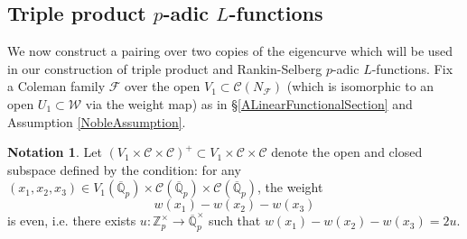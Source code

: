 \documentclass[10pt, oneside]{amsart}
\numberwithin{equation}{subsection}
\theoremstyle{definition}
\newtheorem{notation}[equation]{Notation}
\theoremstyle{remark}
\newcommand{\mbb}[1]{\mathbb{#1}}
\begin{document}
\subsection{Triple product \texorpdfstring{$p$}{p}-adic \texorpdfstring{$L$}{L}-functions}

We now construct a pairing over two copies of the eigencurve which will be used in our construction of triple product and Rankin-Selberg $p$-adic $L$-functions. Fix a Coleman family $\mathcal{F}$ over the open $V_1 \subset \mathcal{C}(N_{\mathcal{F}})$ (which is isomorphic to an open $U_1 \subset \mathcal{W}$ via the weight map) as in \S \ref{ALinearFunctionalSection} and Assumption \ref{NobleAssumption}.

\begin{notation} 
Let $\left( V_1 \times \mathcal{C} \times \mathcal{C} \right)^+ \subset V_1 \times \mathcal{C} \times \mathcal{C}$ denote the open and closed subspace defined by the condition: for any $(x_1, x_2, x_3) \in V_1({\overline{\mathbb{Q}}_p}) \times \mathcal{C}({\overline{\mathbb{Q}}_p}) \times \mathcal{C}({\overline{\mathbb{Q}}_p})$, the weight
\[
w(x_1) - w(x_2) - w(x_3)
\]
is even, i.e. there exists $u \colon \mbb{Z}_p^{\times} \to \overline{\mathbb{Q}}_p^{\times}$ such that $w(x_1) - w(x_2) - w(x_3) = 2u$.
\end{notation} 
\end{document}
